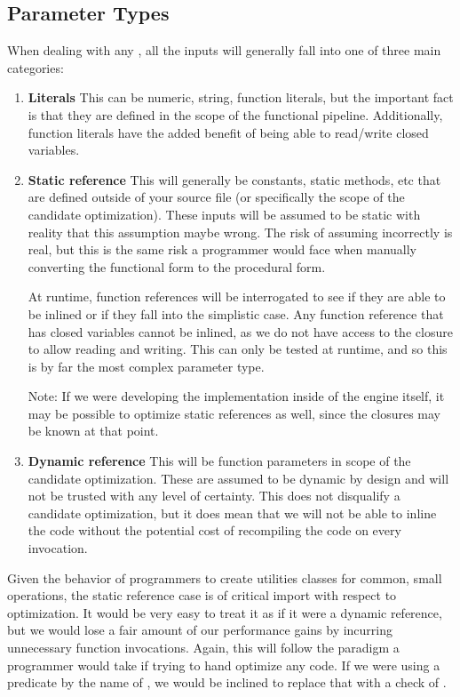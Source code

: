 \subsection{Parameter Types}
When dealing with any \pipelineoperator, all the inputs will generally fall into one of three main categories:

\begin{enumerate}
  \item \textbf{Literals}
    This can be numeric, string, function literals, but the important fact is that they are defined in the scope of the functional pipeline.  Additionally, function literals have the added benefit of being able to read/write closed variables.

  \item \textbf{Static reference}
    This will generally be constants, static methods, etc that are defined outside of your source file (or specifically the scope of the candidate optimization).  These inputs will be assumed to be static with reality that this assumption maybe wrong.  The risk of assuming incorrectly is real, but this is the same risk a programmer would face when manually converting the functional form to the procedural form.  
    
    At runtime, function references will be interrogated to see if they are able to be inlined or if they fall into the simplistic case.  Any function reference that has closed variables cannot be inlined, as we do not have access to the closure to allow reading and writing.  This can only be tested at runtime, and so this is by far the most complex parameter type.  
    
    Note: If we were developing the implementation inside of the \javascript engine itself, it may be possible to optimize static references as well, since the closures may be known at that point.

  \item \textbf{Dynamic reference}
    This will be function parameters in scope of the candidate optimization. These are assumed to be dynamic by design and will not be trusted with any level of certainty.  This does not disqualify a candidate optimization, but it does mean that we will not be able to inline the code without the potential cost of recompiling the code on every invocation.
\end{enumerate}

Given the behavior of programmers to create utilities classes for common, small operations, the static reference case is of critical import with respect to optimization.  It would be very easy to treat it as if it were a dynamic reference, but we would lose a fair amount of our performance gains by incurring unnecessary function invocations.  Again, this will follow the paradigm a programmer would take if trying to hand optimize any code.  If we were using a predicate by the name of , we would be inclined to replace that with a check of . 